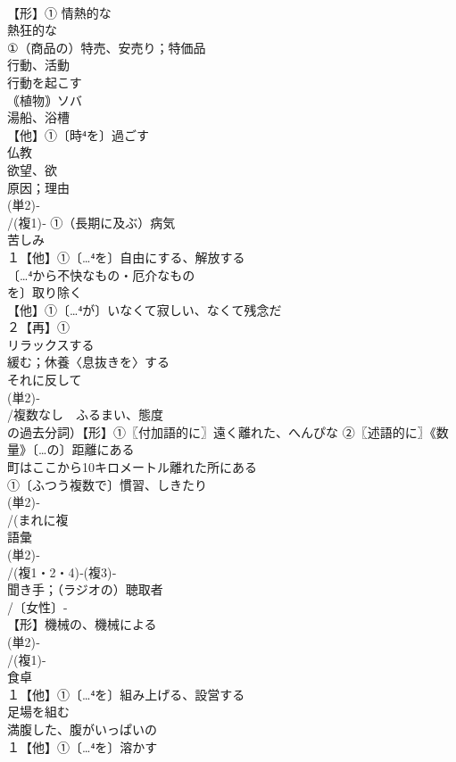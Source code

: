 \documentclass[8pt]{extreport}
\begin{document}
\begin{CJK}{UTF8}{min}
\\	【形】① 情熱的な 
\\	熱狂的な
\\	①（商品の）特売、安売り；特価品 
\\	行動、活動 
\\	行動を起こす
\\	｟植物｠ソバ 
\\	湯船、浴槽
\\	【他】①〔時⁴を〕過ごす 
\\	仏教 
\\	欲望、欲 
\\	原因；理由 
\\	(単2)‐
\\	/(複1)‐ ①（長期に及ぶ）病気 
\\	苦しみ
\\	１【他】①〔…⁴を〕自由にする、解放する 
\\	〔…⁴から不快なもの・厄介なもの
\\	を〕取り除く
\\	【他】①〔…⁴が〕いなくて寂しい、なくて残念だ 
\\	２【再】①
\\	リラックスする　
\\	緩む；休養〈息抜きを〉する
\\	それに反して
\\	(単2)‐
\\	/複数なし　ふるまい、態度 
\\	の過去分詞）【形】①〖付加語的に〗遠く離れた、へんぴな ②〖述語的に〗《数量》〔…の〕距離にある 
\\	町はここから10キロメートル離れた所にある
\\	①〔ふつう複数で〕慣習、しきたり 
\\	(単2)‐
\\	/(まれに複
\\	語彙 
\\	(単2)‐
\\	/(複1・2・4)‐(複3)‐
\\	聞き手；（ラジオの）聴取者 
\\	/〔女性〕-
\\	【形】機械の、機械による 
\\	(単2)‐
\\	/(複1)-
\\	食卓 
\\	１【他】①〔…⁴を〕組み上げる、設営する 
\\	足場を組む
\\	満腹した、腹がいっぱいの
\\	１【他】①〔…⁴を〕溶かす 

\end{CJK}
\end{document}
